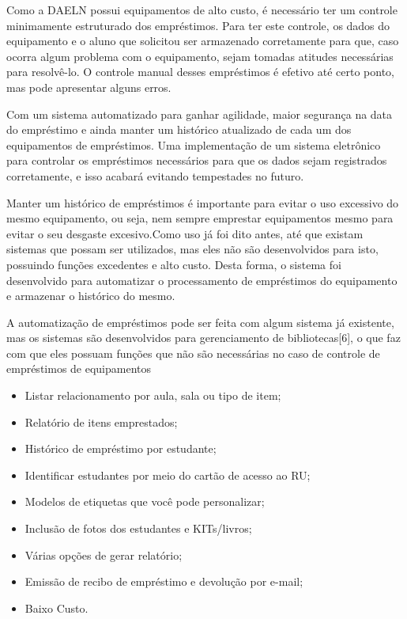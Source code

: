 \vspace{-42pt}
Como a DAELN possui equipamentos de alto custo, é necessário ter um controle minimamente estruturado dos empréstimos. Para ter este controle, os dados do equipamento e o aluno que solicitou ser armazenado corretamente para que, caso ocorra algum problema com o equipamento, sejam tomadas atitudes necessárias para resolvê-lo. O controle manual desses empréstimos é efetivo até certo ponto, mas pode apresentar alguns erros.

Com um sistema automatizado para ganhar agilidade, maior segurança na data do empréstimo e ainda manter um histórico atualizado de cada um dos equipamentos de empréstimos. Uma implementação de um sistema eletrônico para controlar os empréstimos necessários para que os dados sejam registrados corretamente, e isso acabará evitando tempestades no futuro.

Manter um histórico de empréstimos é importante para evitar o uso excessivo do mesmo equipamento, ou seja, nem sempre emprestar equipamentos mesmo para evitar o seu desgaste excesivo.Como uso já foi dito antes, até que existam sistemas que possam ser utilizados, mas eles não são desenvolvidos para isto, possuindo funções excedentes e alto custo. Desta forma, o sistema foi desenvolvido para automatizar o processamento de empréstimos do equipamento e armazenar o histórico do mesmo.

A automatização de empréstimos pode ser feita com algum sistema já existente, mas os sistemas são desenvolvidos para gerenciamento de bibliotecas[6], o que faz com que eles possuam funções que não são necessárias no caso de controle de empréstimos de equipamentos
\begin{itemize}
   \item Listar relacionamento por aula, sala ou tipo de item;
   \item Relatório de itens emprestados;
   \item Histórico de empréstimo por estudante;
   \item Identificar estudantes por meio do cartão de acesso ao RU;
   \item Modelos de etiquetas que você pode personalizar;
   \item Inclusão de fotos dos estudantes e KITs/livros;
   \item Várias opções de gerar relatório;
   \item Emissão de recibo de empréstimo e devolução por e-mail;
   \item Baixo Custo.
\end{itemize}
